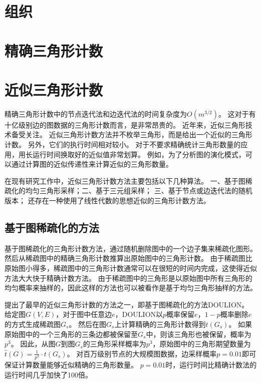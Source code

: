 \section{组织}

\section{精确三角形计数}

\section{近似三角形计数}

精确三角形计数中的节点迭代法和边迭代法的时间复杂度为$O(m^{3/2})$。
这对于有十亿级别边的图数据的三角形计数而言，是非常昂贵的。
近年来，近似三角形技术备受关注。
近似三角形计数方法并不枚举三角形，而是给出一个近似的三角形计数。
另外，它们的执行时间相对较小。
对于不要求精确统计三角形数量的应用，用长运行时间换取好的近似值非常划算。
例如，为了分析图的演化模式，可以通过计算图的近似传递性来计算近似的三角形数量。

在现有研究工作中，近似三角形计数方法主要包括以下几种算法。
一、基于图稀疏化的均匀三角形采样；二、基于三元组采样；
三、基于节点或边迭代法的随机版本；
还存在一种使用了线性代数的思想近似的三角形计数方法。

\subsection{基于图稀疏化的方法}

基于图稀疏化的三角形计数方法，通过随机删除图中的一个边子集来稀疏化图形。
然后从稀疏图中的精确三角形计数推算出原始图中的三角形计数。
由于稀疏图比原始图小得多，稀疏图中的三角形计数通常可以在很短的时间内完成，这使得近似方法大大快于精确计数方法。
由于稀疏图中的三角形是以原始图中所有三角形的均匀概率来抽样的，因此这样的方法也可以被看作是基于均匀三角形抽样的方法。

\cite{tsourakakis2009doulion}提出了最早的近似三角形计数的方法之一，即基于图稀疏化的方法DOULION。
给定图$G(V,E)$，对于图中任意边$e$，DOULION以$p$概率保留$e$，$1-p$概率删除$e$的方式生成稀疏图$G_s$。
然后在图$G_s$上计算精确的三角形计数得到$t(G_s)$。
如果原始图中的一个三角形的三条边都被保留至$G_s$中，则该三角形也被保留，概率为$p^3$。
因此，从图$G$到图$G_s$的三角形采样概率为$p^3$，原始图中的三角形期望数量为
$\hat{t}(G)=\frac{1}{p^3}\cdot t(G_s) $。
对百万级别节点的大规模图数据，边采样概率$p=0.01$即可保证计算数量能够近似精确的三角形数量。
$p=0.01$时，运行时间比精确计数法的运行时间几乎加快了100倍。

